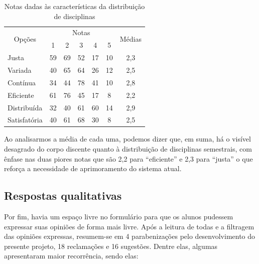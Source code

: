\begin{table}[htbp]\centering
  \caption{Notas dadas às características da distribuição de disciplinas}
  \label{table:6.0-Opiniao}
  \begin{tabular}{| l | c c c c c | c |}
    \hline
    \multicolumn{1}{|c|}{\multirow{2}{*}{Opções}} &
    \multicolumn{5}{c|}{Notas}                    &
    \multicolumn{1}{|c|}{\multirow{2}{*}{Médias}}
    \\
    \multicolumn{1}{|c|}{}                        &
    \multicolumn{1}{c|}{1}                        &
    \multicolumn{1}{c|}{2}                        &
    \multicolumn{1}{c|}{3}                        &
    \multicolumn{1}{c|}{4}                        &
    \multicolumn{1}{c|}{5}                        &
    \multicolumn{1}{|c|}{}                                                       \\
    \hline
    Justa                                         & 59 & 69 & 52 & 17 & 10 & 2,3 \\
    Variada                                       & 40 & 65 & 64 & 26 & 12 & 2,5 \\
    Contínua                                      & 34 & 44 & 78 & 41 & 10 & 2,8 \\
    Eficiente                                     & 61 & 76 & 45 & 17 & 8  & 2,2 \\
    Distribuída                                   & 32 & 40 & 61 & 60 & 14 & 2,9 \\
    Satisfatória                                  & 40 & 61 & 68 & 30 & 8  & 2,5 \\
    \hline
  \end{tabular}
\end{table}

Ao analisarmos a média de cada uma, podemos dizer que, em suma, há o visível desagrado do corpo discente quanto à distribuição de disciplinas semestrais, com ênfase nas duas piores notas que são 2,2 para ``eficiente'' e 2,3 para ``justa'' o que reforça a necessidade de aprimoramento do sistema atual.

\subsection{Respostas qualitativas} %

Por fim, havia um espaço livre no formulário para que os alunos pudessem expressar suas opiniões de forma mais livre. Após a leitura de todas e a filtragem das opiniões expressas, resumem-se em 4 parabenizações pelo desenvolvimento do presente projeto, 18 reclamações e 16 sugestões. Dentre elas, algumas apresentaram maior recorrência, sendo elas:

